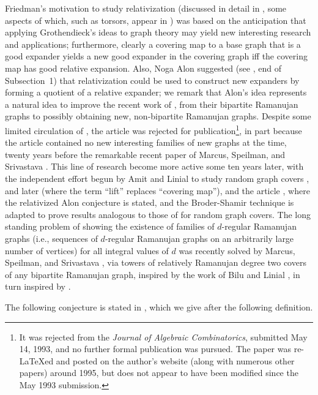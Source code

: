 \documentclass{memo-l}
\theoremstyle{plain}
\theoremstyle{definition}
\numberwithin{section}{chapter}
\numberwithin{equation}{chapter}
\theoremstyle{plain}
\theoremstyle{definition}
\begin{document}
Friedman's motivation to study relativization
(discussed in detail in
\cite{friedman_relative_boolean}, some aspects of which, such as
torsors, appear in \cite{friedman_geometric_aspects})
was based on the anticipation that applying
Grothendieck's ideas to graph theory may
yield new interesting research and applications; furthermore,
clearly a covering map to a base graph that is a good expander 
yields a new good expander in the covering graph
iff the covering map has good relative expansion.
Also, Noga Alon suggested 
(see \cite{friedman_relative_boolean}, end
of Subsection~1)
that relativization could be used to construct new expanders by
forming a quotient of a relative expander; we remark that
Alon's idea represents 
a natural
idea to improve
the recent work of \cite{mss}, from their bipartite Ramanujan graphs
to possibly obtaining new, non-bipartite Ramanujan graphs. 
Despite some limited
circulation of \cite{friedman_relative_boolean}, 
the article was rejected for publication\footnote{It was
rejected from the {\sl Journal of Algebraic Combinatorics},
submitted May 14, 1993, and no further formal publication
was pursued.  The paper was re-LaTeXed and posted on the author's
website (along with numerous other papers) around 1995, but does not appear
to have been modified since the May 1993 submission.}, in part because
the article contained no new interesting families of new
graphs at the time, twenty years before the remarkable recent paper
of
Marcus, Speilman, and Srivastava \cite{mss}.
This line of research become more active
some ten years later, with the independent effort begun by
Amit and Linial to study random graph covers
\cite{amit1}, and later \cite{amit2,amit3,amit0,rozenman} (where the
term ``lift'' replaces ``covering map''),
and the article \cite{friedman_relative},
where the relativized Alon conjecture is stated, and the Broder-Shamir
technique is adapted to
prove results analogous to those of \cite{broder} for random graph covers.
The long standing problem
of showing the existence of families of $d$-regular Ramanujan graphs
(i.e., sequences of $d$-regular Ramanujan graphs on an arbitrarily
large number of vertices)
for all integral values of $d$ was recently solved by
Marcus, Speilman, and Srivastava \cite{mss}, via towers of relatively
Ramanujan degree two covers of any bipartite Ramanujan graph,
inspired by the work of Bilu and Linial \cite{bilu}, in turn inspired
by \cite{frieze_malloy}.

The following conjecture is stated in \cite{friedman_relative},
which we give after the following definition.
\end{document}
